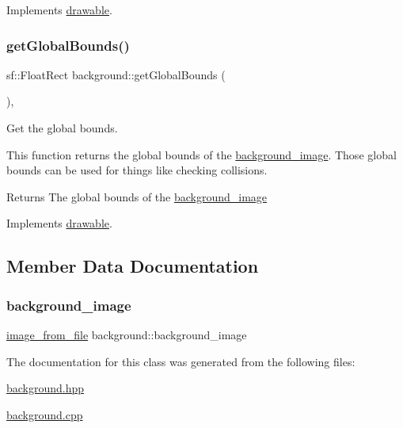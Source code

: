 Implements \hyperlink{classdrawable_a4e49e2c1121704c83ce24c5f48dd910f}{drawable}.

\mbox{\label{classbackground_ab5f2b627cd58e0d07678f0af01c6bd2d}} 
\subsubsection{\texorpdfstring{get\+Global\+Bounds()}{getGlobalBounds()}}
{\footnotesize\ttfamily sf\+::\+Float\+Rect background\+::get\+Global\+Bounds (\begin{DoxyParamCaption}{ }\end{DoxyParamCaption})\hspace{0.3cm}{\ttfamily [override]}, {\ttfamily [virtual]}}



Get the global bounds. 

This function returns the global bounds of the \hyperlink{classbackground_a972ef28e3ac5aea925fc9d00e809d5af}{background\+\_\+image}. Those global bounds can be used for things like checking collisions. \begin{DoxyReturn}{Returns}
The global bounds of the \hyperlink{classbackground_a972ef28e3ac5aea925fc9d00e809d5af}{background\+\_\+image} 
\end{DoxyReturn}


Implements \hyperlink{classdrawable_ae013ac0be47538be9ce885d6642daf73}{drawable}.



\subsection{Member Data Documentation}
\mbox{\label{classbackground_a972ef28e3ac5aea925fc9d00e809d5af}} 
\subsubsection{\texorpdfstring{background\+\_\+image}{background\_image}}
{\footnotesize\ttfamily \hyperlink{classimage__from__file}{image\+\_\+from\+\_\+file} background\+::background\+\_\+image\hspace{0.3cm}{\ttfamily [private]}}



The documentation for this class was generated from the following files\+:\begin{DoxyCompactItemize}
\item 
\hyperlink{background_8hpp}{background.\+hpp}\item 
\hyperlink{background_8cpp}{background.\+cpp}\end{DoxyCompactItemize}
